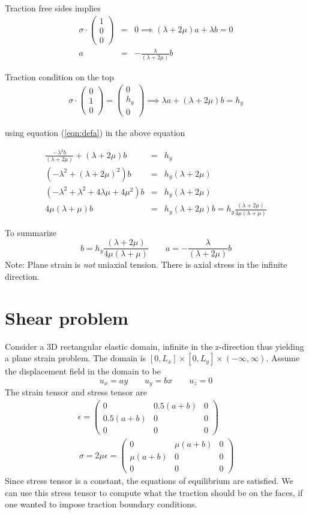 \documentclass[12pt]{article}
\newcommand{\beq}{\begin{equation}}
\newcommand{\eeq}{\end{equation}}
\newcommand{\ber}{\begin{eqnarray}}
\newcommand{\eer}{\end{eqnarray}}
\begin{document}
      
 Traction free sides implies
      \ber
      \sigma\cdot\begin{pmatrix}1 \\ 0 \\ 0\end{pmatrix} &=& 0 \implies      (\lambda+2\mu)a + \lambda{b}=0 \\
      a &=& -\frac{\lambda}{(\lambda+2\mu)}b \label{eqn:defa}
      \eer

      Traction condition on the top
      \ber
      \sigma\cdot\begin{pmatrix}0\\1\\0\end{pmatrix} = \begin{pmatrix}0\\h_y\\0\end{pmatrix} \implies \lambda{a} + (\lambda+2\mu)b = h_y
        \eer

        using equation (\ref{eqn:defa}) in the above equation

        \ber
        \frac{-\lambda^2b}{(\lambda+2\mu)} + (\lambda+2\mu)b &=& h_y \\
        (-\lambda^2 + (\lambda+2\mu)^2)b &=& h_y(\lambda+2\mu)\\
        (-\lambda^2 + \lambda^2 + 4\lambda\mu + 4\mu^2)b &=& h_y(\lambda+2\mu)\\
        4\mu(\lambda+\mu)b &=& h_y(\lambda+2\mu)
        b = h_y\frac{(\lambda+2\mu)}{4\mu(\lambda+\mu)}
        \eer

        To summarize
        \beq
        b = h_y\frac{(\lambda+2\mu)}{4\mu(\lambda+\mu)} \qquad  a = -\frac{\lambda}{(\lambda+2\mu)}b 
        \eeq
Note: Plane strain is \textit{not} uniaxial tension. There is axial stress in the infinite direction.      
\section{Shear problem}        
Consider a 3D rectangular elastic domain, infinite in the z-direction thus yielding a plane strain problem. The domain is  $[0,L_x]\times[0,L_y]\times(-\infty,\infty)$. Assume the displacement field in the domain to be
\beq
u_x = ay \qquad u_y = bx \qquad u_z = 0
\eeq
The strain tensor and stress tensor are
\ber
\epsilon = \begin{pmatrix}0 & 0.5(a+b) & 0\\ 0.5(a+b) & 0 & 0 \\ 0 & 0 & 0\end{pmatrix}\\  \, \sigma = 2\mu\epsilon = \begin{pmatrix}0 & \mu(a+b) & 0\\ \mu(a+b) & 0 & 0 \\ 0 & 0 & 0\end{pmatrix}  
\eer
Since stress tensor is a constant, the equations of equilibrium are satisfied. We can use this stress tensor to compute what the traction should be on the faces, if one wanted to impose traction boundary conditions. 
\end{document}
